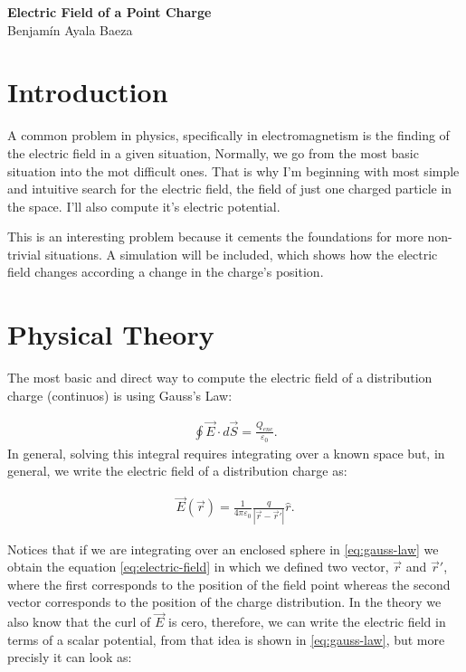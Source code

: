 \documentclass[twoside]{article}
\begin{document}
\thispagestyle{plainfirst}

\begin{tcolorbox}[portada]
    \centering
    {\Huge \bfseries Electric Field of a Point Charge}\\[0.5cm]
    {\large Benjamín Ayala Baeza}
\end{tcolorbox}



\section{Introduction}
A common problem in physics, specifically in electromagnetism is the finding of the electric field in a given situation,
Normally, we go from the most basic situation into the mot difficult ones. That is why I'm beginning with most simple and intuitive 
search for the electric field, the field of just one charged particle in the space. I'll also compute it's electric potential. 

This is an interesting problem because it cements the foundations for more non-trivial situations. 
A simulation will be included, which shows how the electric field changes according a change in the charge's position.

\section{Physical Theory}
The most basic and direct way to compute the electric field of a distribution charge (continuos) is using Gauss's Law:

    \begin{align}
        \oint \vec{E} \cdot d\vec{S} = \frac{Q_{enc}}{\varepsilon_0}.  \label{eq:gauss-law}
    \end{align}
In general, solving this integral requires integrating over a known space but, in general, we write the electric field of a distribution charge as:

    \begin{align}
        \vec{E}(\vec{r}) = \frac{1}{4\pi \varepsilon_0} \frac{q}{|\vec{r}-\vec{r}'|} \hat{r}. \label{eq:electric-field}
    \end{align}

Notices that if we are integrating over an enclosed sphere in \eqref{eq:gauss-law} we obtain the equation \eqref{eq:electric-field} in which we defined two vector, $\vec{r}$ and $\vec{r}'$,
where the first corresponds to the position of the field point whereas the second vector corresponds to the position of the charge distribution.
In the theory we also know that the curl of $\vec{E}$ is cero, therefore, we can write the electric field in terms of a scalar potential, from that idea is shown in \eqref{eq:gauss-law}, but more 
precisly it can look as:
\end{document}
